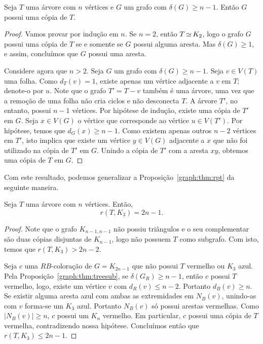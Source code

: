 \begin{proposition}
\label{graph:thm:treesub}
Seja $T$ uma árvore com $n$ vértices e $G$ um grafo com $\delta(G) \geq n-1$. Então $G$ possui uma cópia de $T$.
\end{proposition}
\begin{proof}
Vamos provar por indução em $n$. Se $n = 2$, então $T \operatorname{\simeq} K_2$, logo o grafo $G$ possui uma cópia de $T$ se e somente se $G$ possui alguma aresta. Mas $\delta(G) \geq 1$, e assim, concluímos que $G$ possui uma aresta.

Considere agora que $n > 2$. Seja $G$ um grafo com $\delta(G) \geq n-1$. Seja $v \in V(T)$ uma folha. Como $d_T(v) =1$, existe apenas um vértice adjacente a $v$ em $T$; denote-o por $u$. Note que o grafo $T' = T - v$ também é uma árvore, uma vez que a remoção de uma folha não cria ciclos e não desconecta $T$. A árvore $T'$, no entanto, possui $n-1$ vértices. Por hipótese de indução, existe uma cópia de $T'$ em $G$. Seja $x \in V(G)$ o vértice que corresponde ao vértice $u \in V(T')$.
Por hipótese, temos que $d_G(x) \geq n-1$. Como existem apenas outros $n-2$ vértices em $T'$, isto implica que existe um vértice $y \in V(G)$ adjacente a $x$ que não foi utilizado na cópia de $T'$ em $G$. Unindo a cópia de $T'$ com a aresta $xy$, obtemos uma cópia de $T$ em $G$.
\end{proof}

Com este resultado, podemos generalizar a Proposição~\ref{graph:thm:rpt} da seguinte maneira.

\begin{proposition}
\label{graph:thm:ramseytree}
Seja $T$ uma árvore com $n$ vértices. Então,
\[r(T,K_3) = 2n - 1.\]
\end{proposition}
\begin{proof}
Note que o grafo $K_{n-1,n-1}$ não possiu triângulos e o seu complementar são duas cópias disjuntas de $K_{n-1}$, logo não possuem $T$ como subgrafo. Com isto, temos que $r(T,K_3) > 2n - 2$.

Seja $c$ uma $RB$-coloração de $G = K_{2n-1}$ que não possui $T$ vermelho ou $K_3$ azul. Pela Proposição~\ref{graph:thm:treesub}, se $\delta(G_R) \geq n-1$, então $c$ possui $T$ vermelho, logo, existe um vértice $v$ com $d_R(v) \leq n - 2$. Portanto $d_B(v) \geq n$. Se existir alguma aresta azul com ambas as extremidades em $N_B(v)$, unindo-as com $v$ forma-se um $K_3$ azul.
Portanto $N_B(v)$ só possui arestas vermelhas. Como $|N_B(v)| \geq n$, $c$ possui um $K_n$ vermelho. Em particular, $c$ possui uma cópia de $T$ vermelha, contradizendo nossa hipótese. Concluímos então que $r(T,K_3) \leq 2n - 1$.
\end{proof}

